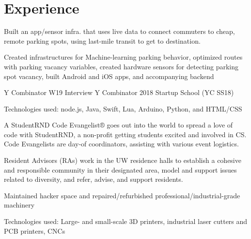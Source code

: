 \documentclass[]{deedy-resume-openfont}
\begin{document}
\section{Experience}
\hfill {}
\begin{tightemize}
	\item Built an app/sensor infra. that uses live data to connect commuters to cheap, remote parking spots, using last-mile transit to get to destination.
	\item Created infrastructures for Machine-learning parking behavior, optimized routes with parking vacancy variables, created hardware sensors for detecting parking spot vacancy, built Android and iOS apps, and accompanying backend
	\item Y Combinator W19 Interview Y Combinator 2018 Startup School (YC SS18)
	\item Technologies used: node.js, Java, Swift, Lua, Arduino, Python, and HTML/CSS
\end{tightemize}
\sectionsep
{}\hfill {}
\begin{tightemize}
	\item A StudentRND Code Evangelist® goes out into the world to spread a love of code with StudentRND, a non-profit getting students excited and involved in CS. Code Evangelists are day-of coordinators, assisting with various event logistics.
\end{tightemize}
\sectionsep
{}\hfill {}
\begin{tightemize}
	\item Resident Advisors (RAs) work in the UW residence halls to establish a cohesive and responsible community in their designated area, model and support issues related to diversity, and refer, advise, and support residents.
\end{tightemize}
\sectionsep
{}\hfill {}
\begin{tightemize}
	\item Maintained hacker space and repaired/refurbished professional/industrial-grade machinery
	\item Technologies used: Large- and small-scale 3D printers, industrial laser cutters and PCB printers, CNCs
\end{tightemize}
\sectionsep
%
%
\end{document}
